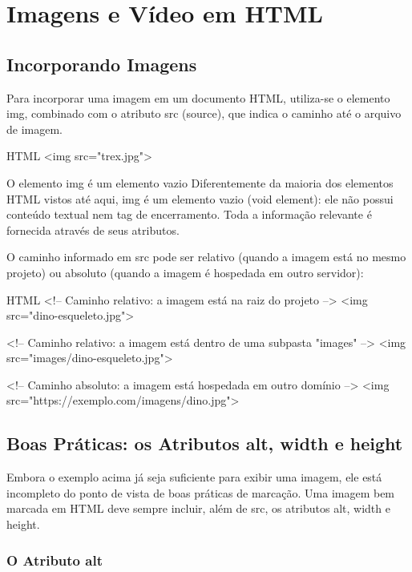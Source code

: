 \chapter{Imagens e Vídeo em HTML}

\section{Incorporando Imagens}

Para incorporar uma imagem em um documento HTML, utiliza-se o elemento img, combinado com o atributo src (source), que indica o caminho até o arquivo de imagem.

\begin{codebox}{HTML}
<img src="trex.jpg">
\end{codebox}

\begin{infobox}{O elemento img é um elemento vazio}
Diferentemente da maioria dos elementos HTML vistos até aqui, img é um elemento vazio (void element): ele não possui conteúdo textual nem tag de encerramento. Toda a informação relevante é fornecida através de seus atributos.
\end{infobox}

O caminho informado em src pode ser relativo (quando a imagem está no mesmo projeto) ou absoluto (quando a imagem é hospedada em outro servidor):

\begin{codebox}{HTML}
<!-- Caminho relativo: a imagem está na raiz do projeto -->
<img src="dino-esqueleto.jpg">

<!-- Caminho relativo: a imagem está dentro de uma subpasta "images" -->
<img src="images/dino-esqueleto.jpg">

<!-- Caminho absoluto: a imagem está hospedada em outro domínio -->
<img src="https://exemplo.com/imagens/dino.jpg">
\end{codebox}

\section{Boas Práticas: os Atributos alt, width e height}

Embora o exemplo acima já seja suficiente para exibir uma imagem, ele está incompleto do ponto de vista de boas práticas de marcação. Uma imagem bem marcada em HTML deve sempre incluir, além de src, os atributos alt, width e height.

\subsection{O Atributo alt}


